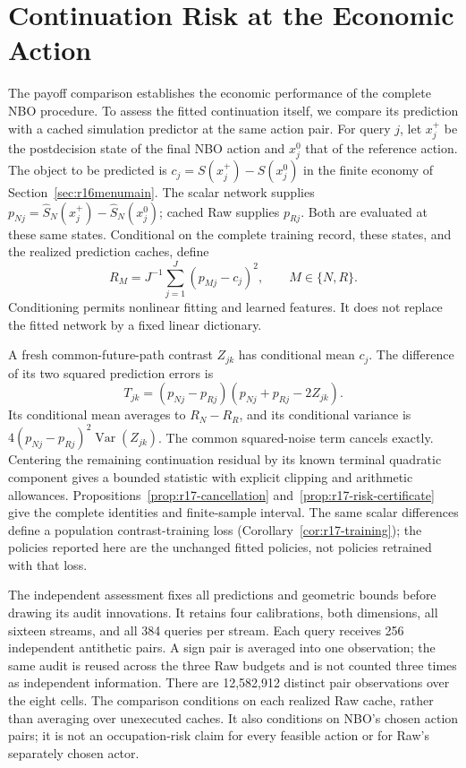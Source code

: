 \section{Continuation Risk at the Economic Action}\label{sec:r18risk}
The payoff comparison establishes the economic performance of the complete
NBO procedure. To assess the fitted continuation itself, we compare its
prediction with a cached simulation predictor at the same action pair.
For query $j$, let $x_j^+$ be the postdecision state of the final NBO action
and $x_j^0$ that of the reference action. The object to be predicted is
$c_j=S(x_j^+)-S(x_j^0)$ in the finite economy of
Section~\ref{sec:r16menumain}. The scalar network supplies
$p_{Nj}=\widehat S_N(x_j^+)-\widehat S_N(x_j^0)$; cached Raw supplies
$p_{Rj}$. Both are evaluated at these same states. Conditional on the
complete training record, these states, and the realized prediction caches,
define
\begin{equation}\label{eq:r18riskmain}
 R_M=J^{-1}\sum_{j=1}^J(p_{Mj}-c_j)^2,\qquad M\in\{N,R\}.
\end{equation}
Conditioning permits nonlinear fitting and learned features. It does not
replace the fitted network by a fixed linear dictionary.

A fresh common-future-path contrast $Z_{jk}$ has conditional mean $c_j$.
The difference of its two squared prediction errors is
\begin{equation}\label{eq:r18cancelmain}
 T_{jk}=(p_{Nj}-p_{Rj})(p_{Nj}+p_{Rj}-2Z_{jk}).
\end{equation}
Its conditional mean averages to $R_N-R_R$, and its conditional variance
is $4(p_{Nj}-p_{Rj})^2\operatorname{Var}(Z_{jk})$.
The common squared-noise term cancels exactly. Centering the remaining
continuation residual by its known terminal quadratic component gives a
bounded statistic with explicit clipping and arithmetic allowances.
Propositions~\ref{prop:r17-cancellation} and~\ref{prop:r17-risk-certificate}
give the complete identities and finite-sample interval. The same scalar
differences define a population contrast-training loss
(Corollary~\ref{cor:r17-training}); the policies reported here are the
unchanged fitted policies, not policies retrained with that loss.

The independent assessment fixes all predictions and geometric bounds before
drawing its audit innovations. It retains four calibrations, both dimensions,
all sixteen streams, and all 384 queries per stream. Each query receives 256
independent antithetic pairs. A sign pair is averaged into one observation;
the same audit is reused across the three Raw budgets and is not counted
three times as independent information. There are 12,582,912 distinct
pair observations over the eight cells. The comparison conditions on each
realized Raw cache, rather than averaging over unexecuted caches. It also
conditions on NBO's chosen action pairs; it is not an occupation-risk claim
for every feasible action or for Raw's separately chosen actor.

